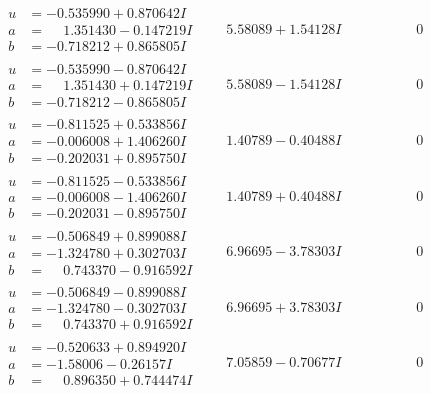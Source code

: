 \documentclass[1p]{elsarticle_modified}
\theoremstyle{definition}
\begin{document}
$$\begin{array}{c|c|c}
\begin{aligned}
u &= -0.535990 + 0.870642 I \\
a &= \phantom{-}1.351430 - 0.147219 I \\
b &= -0.718212 + 0.865805 I\end{aligned}
 & \phantom{-}5.58089 + 1.54128 I & \phantom{-0.000000 } 0 \\ \hline\begin{aligned}
u &= -0.535990 - 0.870642 I \\
a &= \phantom{-}1.351430 + 0.147219 I \\
b &= -0.718212 - 0.865805 I\end{aligned}
 & \phantom{-}5.58089 - 1.54128 I & \phantom{-0.000000 } 0 \\ \hline\begin{aligned}
u &= -0.811525 + 0.533856 I \\
a &= -0.006008 + 1.406260 I \\
b &= -0.202031 + 0.895750 I\end{aligned}
 & \phantom{-}1.40789 - 0.40488 I & \phantom{-0.000000 } 0 \\ \hline\begin{aligned}
u &= -0.811525 - 0.533856 I \\
a &= -0.006008 - 1.406260 I \\
b &= -0.202031 - 0.895750 I\end{aligned}
 & \phantom{-}1.40789 + 0.40488 I & \phantom{-0.000000 } 0 \\ \hline\begin{aligned}
u &= -0.506849 + 0.899088 I \\
a &= -1.324780 + 0.302703 I \\
b &= \phantom{-}0.743370 - 0.916592 I\end{aligned}
 & \phantom{-}6.96695 - 3.78303 I & \phantom{-0.000000 } 0 \\ \hline\begin{aligned}
u &= -0.506849 - 0.899088 I \\
a &= -1.324780 - 0.302703 I \\
b &= \phantom{-}0.743370 + 0.916592 I\end{aligned}
 & \phantom{-}6.96695 + 3.78303 I & \phantom{-0.000000 } 0 \\ \hline\begin{aligned}
u &= -0.520633 + 0.894920 I \\
a &= -1.58006 - 0.26157 I \\
b &= \phantom{-}0.896350 + 0.744474 I\end{aligned}
 & \phantom{-}7.05859 - 0.70677 I & \phantom{-0.000000 } 0 \\ \hline\begin{aligned}

\end{aligned}
\end{array}$$
\end{document}
